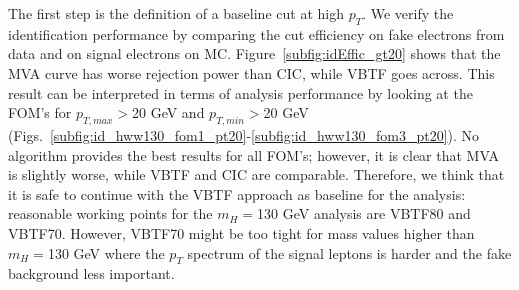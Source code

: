 The first step is the definition of a baseline cut at high $p_T$. 
We verify the identification performance by comparing the cut efficiency on fake electrons from data and on signal electrons on MC.
Figure~\ref{subfig:idEffic_gt20} shows that the MVA curve has worse rejection power than CIC, while VBTF goes across.
This result can be interpreted in terms of analysis performance by looking at the FOM's for $p_{T,max}>$20 GeV and $p_{T,min}>$20 GeV
(Figs.~\ref{subfig:id_hww130_fom1_pt20}-\ref{subfig:id_hww130_fom3_pt20}). 
No algorithm provides the best results for all FOM's; however, it is clear that MVA is slightly worse, while VBTF and CIC are comparable.
Therefore, we think that it is safe to continue with the VBTF approach as baseline for the analysis:
reasonable working points for the $m_H=$130 GeV analysis are VBTF80 and VBTF70. 
However, VBTF70 might be too tight for mass values higher than $m_H=$130 GeV where the $p_T$ spectrum of the signal leptons 
is harder and the fake background less important.
 
